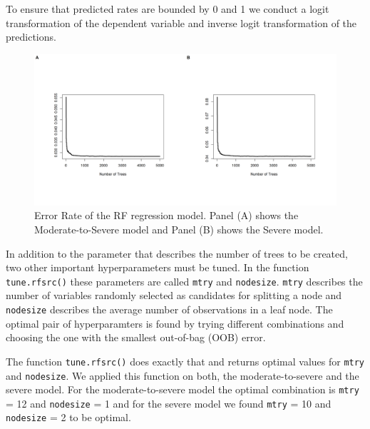 \documentclass{article}
\begin{document}

To ensure that predicted rates are bounded by 0 and 1 we conduct a logit transformation of the dependent variable and inverse logit transformation of the predictions. 

\begin{figure}[H]
  \centering
  \includegraphics[width=\linewidth]{img/model/error_rf.png}
  \caption{Error Rate of the RF regression model. Panel (A) shows the Moderate-to-Severe model and Panel (B) shows the Severe model.}
  \label{fig:rf_error}
\end{figure}


In addition to the parameter that describes the number of trees to be created, two other important hyperparameters must be tuned. In the function \texttt{tune.rfsrc()} these parameters are called \texttt{mtry} and \texttt{nodesize}. \texttt{mtry} describes the number of variables randomly selected as candidates for splitting a node and \texttt{nodesize} describes the average number of observations in a leaf node. The optimal pair of hyperparamters is found by trying different combinations and choosing the one with the smallest out-of-bag (OOB) error.


The function \texttt{tune.rfsrc()} does exactly that and returns optimal values for \texttt{mtry} and \texttt{nodesize}. We applied this function on both, the moderate-to-severe and the severe model. For the moderate-to-severe model the optimal combination is \texttt{mtry} = 12 and \texttt{nodesize} = 1 and for the severe model we found \texttt{mtry} = 10 and \texttt{nodesize} = 2 to be optimal.
\end{document}
